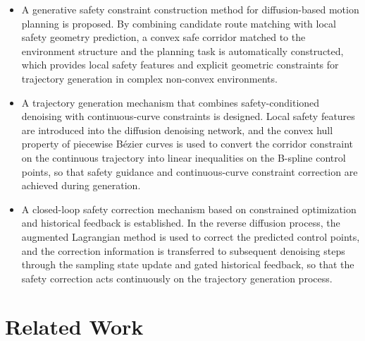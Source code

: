 \documentclass[journal]{IEEEtran}
\begin{document}
\begin{itemize}
\item[(1)] A generative safety constraint construction method for diffusion-based motion planning is proposed. By combining candidate route matching with local safety geometry prediction, a convex safe corridor matched to the environment structure and the planning task is automatically constructed, which provides local safety features and explicit geometric constraints for trajectory generation in complex non-convex environments.

\item[(2)] A trajectory generation mechanism that combines safety-conditioned denoising with continuous-curve constraints is designed. Local safety features are introduced into the diffusion denoising network, and the convex hull property of piecewise B\'ezier curves is used to convert the corridor constraint on the continuous trajectory into linear inequalities on the B-spline control points, so that safety guidance and continuous-curve constraint correction are achieved during generation.

\item[(3)] A closed-loop safety correction mechanism based on constrained optimization and historical feedback is established. In the reverse diffusion process, the augmented Lagrangian method is used to correct the predicted control points, and the correction information is transferred to subsequent denoising steps through the sampling state update and gated historical feedback, so that the safety correction acts continuously on the trajectory generation process.
\end{itemize}

\section{Related Work}
\end{document}
